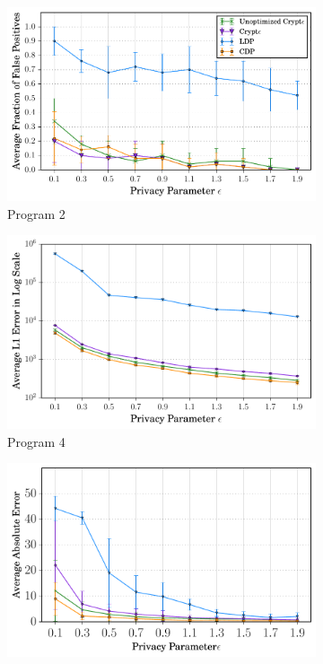 \begin{figure}
    \begin{subfigure}[b]{0.25\linewidth}
        \centering
         \includegraphics[width=1\linewidth]{2_final.pdf}
        \caption{ Program 2}
        \label{fig:P2}
    \end{subfigure}
    \begin{subfigure}[b]{0.25\linewidth}
    \centering \includegraphics[width=1\linewidth]{4_final.pdf}
        \caption{Program 4}
        \label{fig:P4}\end{subfigure}
    \begin{subfigure}[b]{0.25\linewidth}
    \centering    \includegraphics[width=1\linewidth]{6_finals.pdf}

\end{subfigure}
\end{figure}
